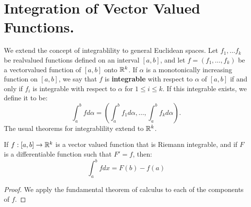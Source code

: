 
\section{Integration of Vector Valued Functions.}

We extend the concept of integrablility to general Euclidean spaces. Let $ f_1,
\dots f_k$ be realvalued functions defined on an interval $[a,b]$, and let
$f=(f_1, \dots, f_k)$ be a vectorvalued function of $[a,b]$ onto  $\mathbb{R}^k$. If
$\alpha$ is a monotonically increasing function on  $[a,b]$, we say that  $f$ is
\textbf{integrable} with respect to $\alpha$ of  $[a,b]$ if and only if  $f_i$
is integrable with respect to $\alpha$ for  $1 \leq i \leq k$. If this
integrable exists, we define it to be:
    \begin{equation}
        \int_{a}^{b}{f d\alpha}=(\int_{a}^{b}{f_1 d\alpha}, \dots,
        \int_{a}^{b}{f_k d\alpha}).
    \end{equation}
The usual theorems for integrablility extend to $\mathbb{R}^k$.

\begin{theorem}\label{7.4.1}
    If $f:[a,b] \rightarrow \mathbb{R}^k$ is a vector valued function that is  Riemann
    integrable, and if  $F$ is a differentiable function such that  $F'=f$,
    then:
        \begin{equation}
            \int_{a}^{b}{f dx}=F(b)-f(a)		
        \end{equation}
\end{theorem}
\begin{proof}
    We apply the fundamental theorem of calculus to each of the components of
    $f$.		
\end{proof}

